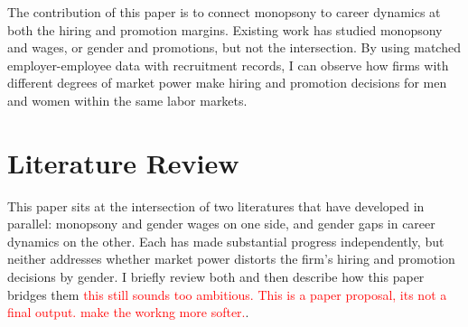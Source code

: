 \documentclass[11pt]{article}
\begin{document}

The contribution of this paper is to connect monopsony to career dynamics at both the hiring and promotion margins. Existing work has studied monopsony and wages, or gender and promotions, but not the intersection. By using matched employer-employee data with recruitment records, I can observe how firms with different degrees of market power make hiring and promotion decisions for men and women within the same labor markets.


\section{Literature Review}

This paper sits at the intersection of two literatures that have developed in parallel: monopsony and gender wages on one side, and gender gaps in career dynamics on the other. Each has made substantial progress independently, but neither addresses whether market power distorts the firm's hiring and promotion decisions by gender. I briefly review both and then describe how this paper bridges them \textcolor{red}{this still sounds too ambitious. This is a paper proposal, its not a final output. make the workng more softer.}.
\end{document}
